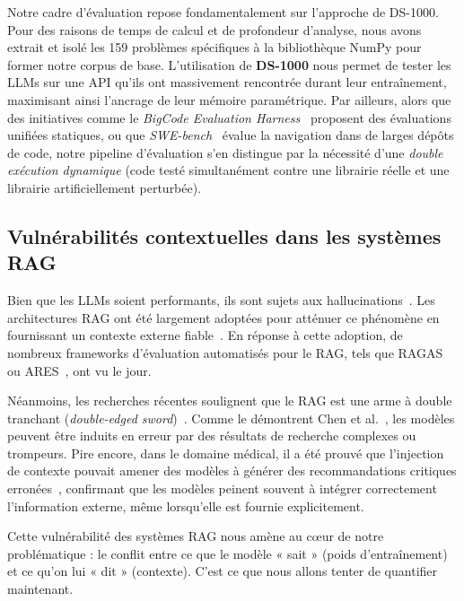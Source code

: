 \documentclass[11pt, a4paper]{article}
\begin{document}
Notre cadre d'évaluation repose fondamentalement sur l'approche de DS-1000. Pour des raisons de temps de calcul et de profondeur d'analyse, nous avons extrait et isolé les 159 problèmes spécifiques à la bibliothèque NumPy pour former notre corpus de base. L'utilisation de \textbf{DS-1000} nous permet de tester les LLMs sur une API qu'ils ont massivement rencontrée durant leur entraînement, maximisant ainsi l'ancrage de leur mémoire paramétrique. Par ailleurs, alors que des initiatives comme le \textit{BigCode Evaluation Harness}~\cite{bigcode2023harness} proposent des évaluations unifiées statiques, ou que \textit{SWE-bench}~\cite{jimenez2023swebench} évalue la navigation dans de larges dépôts de code, notre pipeline d'évaluation s'en distingue par la nécessité d'une \textit{double exécution dynamique} (code testé simultanément contre une librairie réelle et une librairie artificiellement perturbée).

\subsection{Vulnérabilités contextuelles dans les systèmes RAG}

Bien que les LLMs soient performants, ils sont sujets aux hallucinations~\cite{kaddour2023}. Les architectures RAG ont été largement adoptées pour atténuer ce phénomène en fournissant un contexte externe fiable~\cite{shuster2021}. En réponse à cette adoption, de nombreux frameworks d'évaluation automatisés pour le RAG, tels que RAGAS~\cite{es2023} ou ARES~\cite{saadfalcon2023b}, ont vu le jour.

Néanmoins, les recherches récentes soulignent que le RAG est une arme à double tranchant (\textit{double-edged sword})~\cite{foulds2024}. Comme le démontrent Chen et al.~\cite{chen2024}, les modèles peuvent être induits en erreur par des résultats de recherche complexes ou trompeurs. Pire encore, dans le domaine médical, il a été prouvé que l'injection de contexte pouvait amener des modèles à générer des recommandations critiques erronées~\cite{ahmad2023}, confirmant que les modèles peinent souvent à intégrer correctement l'information externe, même lorsqu'elle est fournie explicitement.

Cette vulnérabilité des systèmes RAG nous amène au cœur de notre problématique : le conflit entre ce que le modèle « sait » (poids d'entraînement) et ce qu'on lui « dit » (contexte). C'est ce que nous allons tenter de quantifier maintenant.
\end{document}
